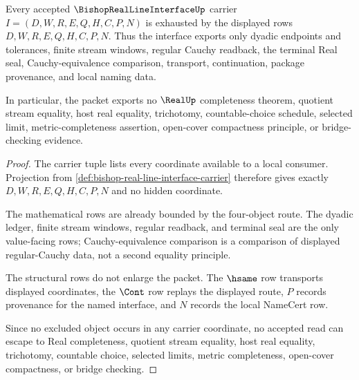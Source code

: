 \begin{theorem}
\label{thm:bishop-real-line-interface-nonescape}
Every accepted $\BishopRealLineInterfaceUp$ carrier $I=(D,W,R,E,Q,H,C,P,N)$ is exhausted by the displayed rows $D,W,R,E,Q,H,C,P,N$. Thus the interface exports only dyadic endpoints and tolerances, finite stream windows, regular Cauchy readback, the terminal Real seal, Cauchy-equivalence comparison, transport, continuation, package provenance, and local naming data.

In particular, the packet exports no $\RealUp$ completeness theorem, quotient stream equality, host real equality, trichotomy, countable-choice schedule, selected limit, metric-completeness assertion, open-cover compactness principle, or bridge-checking evidence.
\end{theorem}
\begin{proof}
The carrier tuple lists every coordinate available to a local consumer. Projection from \autoref{def:bishop-real-line-interface-carrier} therefore gives exactly $D,W,R,E,Q,H,C,P,N$ and no hidden coordinate.

The mathematical rows are already bounded by the four-object route. The dyadic ledger, finite stream windows, regular readback, and terminal seal are the only value-facing rows; Cauchy-equivalence comparison is a comparison of displayed regular-Cauchy data, not a second equality principle.

The structural rows do not enlarge the packet. The $\hsame$ row transports displayed coordinates, the $\Cont$ row replays the displayed route, $P$ records provenance for the named interface, and $N$ records the local NameCert row.

Since no excluded object occurs in any carrier coordinate, no accepted read can escape to Real completeness, quotient stream equality, host real equality, trichotomy, countable choice, selected limits, metric completeness, open-cover compactness, or bridge checking.
\end{proof}


